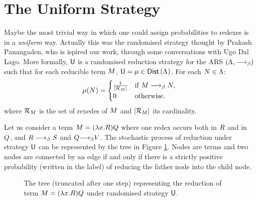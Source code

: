 \section{The Uniform Strategy}
Maybe the most trivial way in which one could assign probabilities to redexes is in a \emph{uniform} way. Actually this was the randomised strategy thought by Prakash Panangaden, who is ispired our work, through some conversations with Ugo Dal Lago. More formally, $\mathsf{U}$ is a randomised reduction strategy for the ARS $(\Lambda,\longrightarrow_\beta)$ such that for each reducible term $M$, ${\mathsf{U}=\mu\in\textsf{Dist}\left(\Lambda\right)}$. For each $N\in\Lambda$:
$$
\mu(N)=\begin{cases}
\frac{1}{|\mathcal{R}_{M}|} & \text{if }M\longrightarrow_\beta N ,\\
0 & \text{otherwise}.\\
\end{cases}
$$
where $\mathcal{R}_{M}$ is the set of rexedes of $M$ and $|\mathcal{R}_{M}|$ its cardinality.
\begin{example}
	Let us consider a term $M = (\lambda x.R)Q$
	where one redex occurs both in $R$ and in $Q$, and
	$R\longrightarrow_\beta S$ and
	$Q{\longrightarrow_\beta}V$. The stochastic process of reduction under strategy $\mathsf{U}$ can be represented by the tree in Figure \ref{figure:unitree}. Nodes are terms and two nodes are connected by an edge if and only if there is a strictly positive probability (written in the label) of reducing the father node into the child node.
\end{example}
\begin{figure}
	\begin{center}
		\end{center}
	\caption{The tree (truncated after one step) representing the reduction of term $M = (\lambda x.R)Q$ under randomised strategy $\mathsf{U}$.}
	\label{figure:unitree}
\end{figure}
